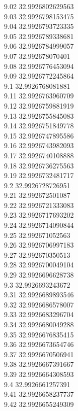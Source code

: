 {9.02	32.9926802629563\\
9.03	32.9926798153475\\
9.04	32.9926793723335\\
9.05	32.9926789338681\\
9.06	32.9926784999057\\
9.07	32.992678070401\\
9.08	32.9926776453094\\
9.09	32.9926772245864\\
9.1	32.9926768081881\\
9.11	32.9926763960709\\
9.12	32.9926759881919\\
9.13	32.9926755845083\\
9.14	32.9926751849778\\
9.15	32.9926747895586\\
9.16	32.9926743982093\\
9.17	32.9926740108888\\
9.18	32.9926736275563\\
9.19	32.9926732481717\\
9.2	32.9926728726951\\
9.21	32.992672501087\\
9.22	32.9926721333083\\
9.23	32.9926717693202\\
9.24	32.9926714090844\\
9.25	32.992671052563\\
9.26	32.9926706997183\\
9.27	32.992670350513\\
9.28	32.9926700049104\\
9.29	32.9926696628738\\
9.3	32.9926693243672\\
9.31	32.9926689893546\\
9.32	32.9926686578007\\
9.33	32.9926683296704\\
9.34	32.9926680049288\\
9.35	32.9926676835415\\
9.36	32.9926673654746\\
9.37	32.9926670506941\\
9.38	32.9926667391667\\
9.39	32.9926664308593\\
9.4	32.9926661257391\\
9.41	32.9926658237737\\
9.42	32.9926655249309\\
}
